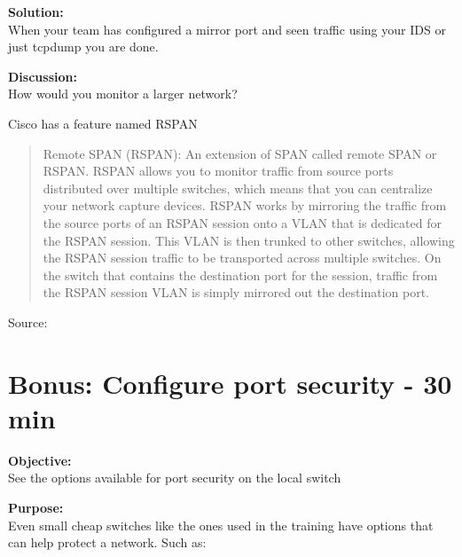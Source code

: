 \documentclass[a4paper,11pt,notitlepage]{report}
\begin{document}
{\bf Solution:}\\
When your team has configured a mirror port and seen traffic using your IDS or just tcpdump you are done.

{\bf Discussion:}\\
How would you monitor a larger network?

Cisco has a feature named RSPAN

\begin{quote}
Remote SPAN (RSPAN): An extension of SPAN called remote SPAN or RSPAN. RSPAN allows you to monitor traffic from source ports distributed over multiple switches, which means that you can centralize your network capture devices. RSPAN works by mirroring the traffic from the source ports of an RSPAN session onto a VLAN that is dedicated for the RSPAN session. This VLAN is then trunked to other switches, allowing the RSPAN session traffic to be transported across multiple switches. On the switch that contains the destination port for the session, traffic from the RSPAN session VLAN is simply mirrored out the destination port.
\end{quote}
Source: {\small{}}



\chapter{Bonus: Configure port security - 30 min}
\label{ex:port-security}

{\bf Objective:}\\
See the options available for port security on the local switch

{\bf Purpose:}\\
Even small cheap switches like the ones used in the training have options that can help protect a network. Such as:
\end{document}
